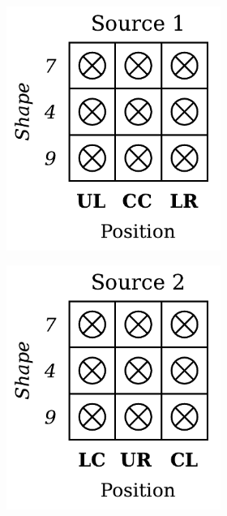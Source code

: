 \begin{dataset}
\begin{figure}[H]
\begin{subfigure}[b]{0.45\textwidth}
\begin{subfigure}[b]{0.48\textwidth}
                \includegraphics[width=\textwidth]{img/datasets/ZSO_fact=pos_env=0.pdf}
            \end{subfigure}
            \begin{subfigure}[b]{0.48\textwidth}
                \centering
                \includegraphics[width=\textwidth]{img/datasets/ZSO_fact=pos_env=1.pdf}

\end{subfigure}
\end{subfigure}
\end{figure}
\end{dataset}
